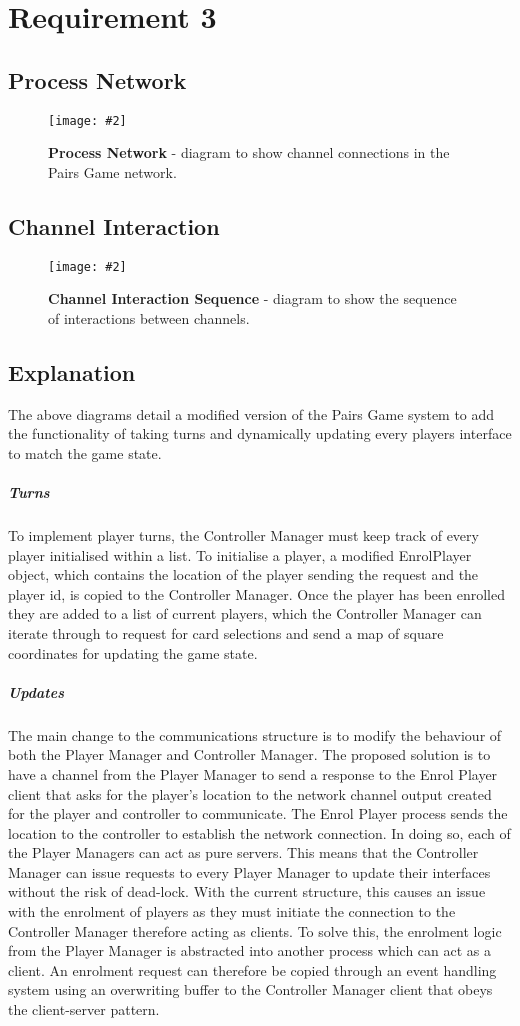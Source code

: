 \documentclass[10pt, a4paper]{article}
\newcommand{\figuremacro}[5]{
    \begin{figure}[#1]
        \centering
        \texttt{[image: \#2]}
        \caption[#3]{\textbf{#3}#4}
        \label{fig:#2}
    \end{figure}
}
\begin{document}
	
	\section{Requirement 3}
	
	\subsection{Process Network}
	
	\figuremacro{H}{processNetwork}{Process Network}{ - diagram to show channel connections in the Pairs Game network.}{1.0}
	
	\subsection{Channel Interaction}
	
	\figuremacro{H}{channelInt}{Channel Interaction Sequence}{ - diagram to show the sequence of interactions between channels.}{1.0}
	
	\subsection{Explanation}
	
	The above diagrams detail a modified version of the Pairs Game system to add the functionality of taking turns and dynamically updating every players interface to match the game state.
	
	\subparagraph{Turns}	
	To implement player turns, the Controller Manager must keep track of every player initialised within a list. To initialise a player, a modified EnrolPlayer object, which contains the location of the player sending the request and the player id, is copied to the Controller Manager. Once the player has been enrolled they are added to a list of current players, which the Controller Manager can iterate through to request for card selections and send a map of square coordinates for updating the game state.
	
	\subparagraph{Updates}
	The main change to the communications structure is to modify the behaviour of both the Player Manager and Controller Manager.	The proposed solution is to have a channel from the Player Manager to send a response to the Enrol Player client that asks for the player's location to the network channel output created for the player and controller to communicate. The Enrol Player process sends the location to the controller to establish the network connection. In doing so, each of the Player Managers can act as pure servers. This means that the Controller Manager can issue requests to every Player Manager to update their interfaces without the risk of dead-lock. With the current structure, this causes an issue with the enrolment of players as they must initiate the connection to the Controller Manager therefore acting as clients. To solve this, the enrolment logic from the Player Manager is abstracted into another process which can act as a client. An enrolment request can therefore be copied through an event handling system using an overwriting buffer to the Controller Manager client that obeys the client-server pattern.
	
\end{document}

